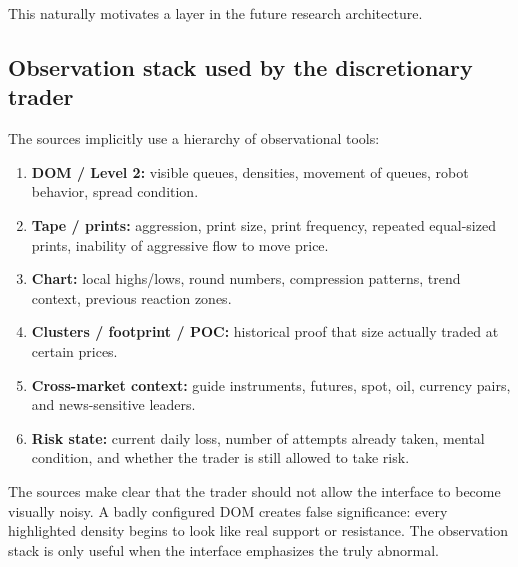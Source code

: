 This naturally motivates a  layer in the future research architecture.

\subsection{Observation stack used by the discretionary trader}

The sources implicitly use a hierarchy of observational tools:

\begin{enumerate}[leftmargin=1.5em]
\item \textbf{DOM / Level 2:} visible queues, densities, movement of queues, robot behavior, spread condition.
\item \textbf{Tape / prints:} aggression, print size, print frequency, repeated equal-sized prints, inability of aggressive flow to move price.
\item \textbf{Chart:} local highs/lows, round numbers, compression patterns, trend context, previous reaction zones.
\item \textbf{Clusters / footprint / POC:} historical proof that size actually traded at certain prices.
\item \textbf{Cross-market context:} guide instruments, futures, spot, oil, currency pairs, and news-sensitive leaders.
\item \textbf{Risk state:} current daily loss, number of attempts already taken, mental condition, and whether the trader is still allowed to take risk.
\end{enumerate}

The sources make clear that the trader should not allow the interface to become visually noisy. A badly configured DOM creates false significance: every highlighted density begins to look like real support or resistance. The observation stack is only useful when the interface emphasizes the truly abnormal.
